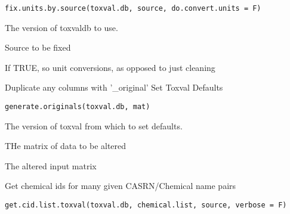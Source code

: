 \documentclass[letterpaper]{book}
\begin{document}
%
\begin{Usage}
\begin{verbatim}
fix.units.by.source(toxval.db, source, do.convert.units = F)
\end{verbatim}
\end{Usage}
%
\begin{Arguments}
\begin{ldescription}
\item[\code{toxval.db}] The version of toxvaldb to use.

\item[\code{source}] Source to be fixed

\item[\code{do.convert.units}] If TRUE, so unit conversions, as opposed to just cleaning
\end{ldescription}
\end{Arguments}
%
\begin{Description}\relax
Duplicate any columns with '\_original'
Set Toxval Defaults
\end{Description}
%
\begin{Usage}
\begin{verbatim}
generate.originals(toxval.db, mat)
\end{verbatim}
\end{Usage}
%
\begin{Arguments}
\begin{ldescription}
\item[\code{toxval.db}] The version of toxval from which to set defaults.

\item[\code{mat}] THe matrix of data to be altered
\end{ldescription}
\end{Arguments}
%
\begin{Value}
The altered input matrix
\end{Value}
%
\begin{Description}\relax
Get chemical ids for many given CASRN/Chemical name pairs
\end{Description}
%
\begin{Usage}
\begin{verbatim}
get.cid.list.toxval(toxval.db, chemical.list, source, verbose = F)
\end{verbatim}
\end{Usage}
\end{document}
